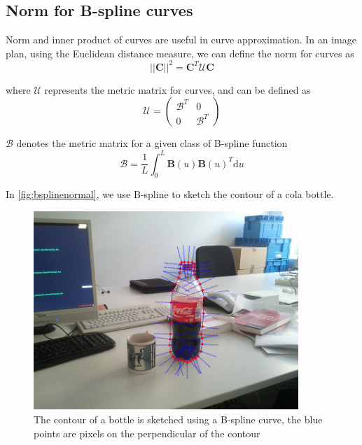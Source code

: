 \subsection{Norm for B-spline curves}
\label{sec:nbc}

Norm and inner product of curves are useful in curve approximation. In
an image plan, using the Euclidean distance measure, we can define the
norm for curves as 
\begin{equation}
  \label{eq:4.13}
  \left| \left| \mathbf{C} \right|\right|^2  = \mathbf{C}^T\mathcal{U}\mathbf{C}
\end{equation}

where $\mathcal{U}$ represents the metric matrix for curves, and can be
defined as 
\begin{equation}
  \label{eq:4.14}
  \mathcal{U} =   \begin{pmatrix}
\mathcal{B}^T & 0 \\
0 &\mathcal{B}^T
  \end{pmatrix}  
\end{equation}

$\mathcal{B}$ denotes the metric matrix for a given class of B-spline
function
\begin{equation}
  \label{eq:4.15}
  \mathcal{B}   = \frac{1}{L} \int_0^L \mathbf{B}(u)\mathbf{B}(u)^T \mathrm{d}u
\end{equation}

In \ref{fig:bsplinenormal}, we use B-spline to sketch the contour of a
cola bottle.
\begin{figure}[htb]
  \centering
  \includegraphics[width=10cm]{images/bsplinenormal.png}
  \caption{The contour of a bottle is sketched using a B-spline
    curve, the blue points are pixels on the perpendicular of the contour}
\label{fig:bspline}
\end{figure}



